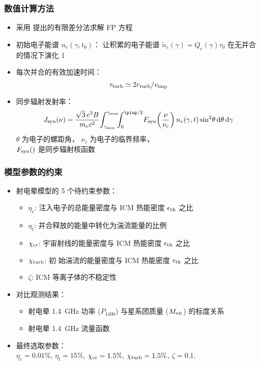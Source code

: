\documentclass{beamer}
\begin{document}
\begin{frame}[subsec]
  \frametitle{数值计算方法}
  \begin{itemize}
    \item 采用 \cite{chang1970} 提出的有限差分法求解 FP 方程
    \item 初始电子能谱 $n_e(\gamma, t_0)$：
      让积累的电子能谱 $\tilde{n}_e(\gamma) = Q_e(\gamma) \tau_0$
      在无并合的情况下演化 \SI{1}{\Gyr}
    \item 每次并合的有效加速时间：
      \begin{equation}
        \tau_{\text{turb}} \simeq 2 r_{\text{turb}} / v_{\text{imp}}
      \end{equation}
    \item 同步辐射发射率：
      \begin{equation}
        J_{\R{syn}}(\nu) =
          \frac{\sqrt{3} \,e^3 B}{m_e c^2}
          \!\int_{\gamma_{\R{min}}}^{\gamma_{\R{max}}}
          \!\!\!\int_0^{\Cpi/2}
          \! F_{\R{syn}} \!\left( \frac{\nu}{\nu_c} \right)
          n_e(\gamma, t) \sin^2 \!\theta \,\D{\theta} \,\D{\gamma}
      \end{equation}
      $\theta$ 为电子的螺距角，
      $\nu_c$ 为电子的临界频率，\\
      $F_{\text{syn}}()$ 是同步辐射核函数
  \end{itemize}
\end{frame}

\begin{frame}[subsec]
  \frametitle{模型参数的约束}
  \begin{itemize}
    \item 射电晕模型的 5 个待约束参数：
      \begin{itemize}
        \item $\eta_e$:
          注入电子的总能量密度与 ICM 热能密度 $\epsilon_{\text{th}}$ 之比
        \item $\eta_t$:
          并合释放的能量中转化为湍流能量的比例
        \item $\chi_{\text{cr}}$:
          宇宙射线的能量密度与 ICM 热能密度 $\epsilon_{\text{th}}$ 之比
        \item $\chi_{\text{turb}}$:
          初  始湍流的能量密度与 ICM 热能密度 $\epsilon_{\text{th}}$ 之比
        \item $\zeta$:
          ICM 等离子体的不稳定性
      \end{itemize}
    \item 对比观测结果：
      \begin{itemize}
        \item 射电晕 \SI{1.4}{\GHz} 功率 ($P_{1400}$)
          与星系团质量 ($M_{\text{vir}}$) 的标度关系
        \item 射电晕 \SI{1.4}{\GHz} 流量函数
      \end{itemize}
    \item 最终选取参数：\\
      $\eta_e = 0.01\%$,
      $\eta_t = 15\%$,
      $\chi_{\text{cr}} = 1.5\%$,
      $\chi_{\text{turb}} = 1.5\%$,
      $\zeta = 0.1$.
  \end{itemize}
\end{frame}
\end{document}
